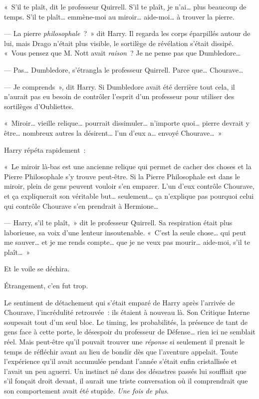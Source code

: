 «~S'il te plaît, dit le professeur Quirrell. S'il te plaît, je n'ai… plus beaucoup de temps. S'il te plaît… emmène-moi au miroir… aide-moi… à trouver la pierre.

--- La pierre \emph{philosophale}~?~» dit Harry. Il regarda les corps éparpillés autour de lui, mais Drago n'était plus visible, le sortilège de révélation s'était dissipé. «~Vous pensez que M. Nott avait \emph{raison}~? Je ne pense pas que Dumbledore…

--- Pas… Dumbledore, s'étrangla le professeur Quirrell. Parce que… Chourave…

--- Je comprends~», dit Harry. Si Dumbledore avait été derrière tout cela, il n'aurait pas eu besoin de contrôler l'esprit d'un professeur pour utiliser des sortilèges d'Oubliettes.

«~Miroir… vieille relique… pourrait dissimuler… n'importe quoi… pierre devrait y être… nombreux autres la désirent… l'un d'eux a… envoyé Chourave…~»

Harry répéta rapidement~:

«~Le miroir là-bas est une ancienne relique qui permet de cacher des choses et la Pierre Philosophale s'y trouve peut-être. Si la Pierre Philosophale est dans le miroir, plein de gens peuvent vouloir s'en emparer. L'un d'eux contrôle Chourave, et ça expliquerait son véritable but… seulement… ça n'explique pas pourquoi celui qui contrôle Chourave s'en prendrait à Hermione…

--- Harry, s'il te plaît,~» dit le professeur Quirrell. Sa respiration était plus laborieuse, sa voix d'une lenteur insoutenable. «~C'est la seule chose… qui peut me sauver… et je me rends compte… que je ne veux pas mourir… aide-moi, s'il te plaît…~»

Et le voile se déchira.

Étrangement, c'en fut trop.

Le sentiment de détachement qui s'était emparé de Harry après l'arrivée de Chourave, l'incrédulité retrouvée~: ils étaient à nouveau là. Son Critique Interne soupesait tout d'un seul bloc. Le timing, les probabilités, la présence de tant de gens face à cette porte, le désespoir du professeur de Défense… rien ici ne semblait réel. Mais peut-être qu'il pouvait trouver une \emph{réponse} si seulement il prenait le temps de réfléchir avant au lieu de bondir dès que l'aventure appelait. Toute l'expérience qu'il avait accumulée pendant l'année s'était enfin cristallisée et l'avait un peu aguerri. Un instinct né dans des désastres passés lui soufflait que s'il fonçait droit devant, il aurait une triste conversation où il comprendrait que son comportement avait été stupide. \emph{Une fois de plus}.

